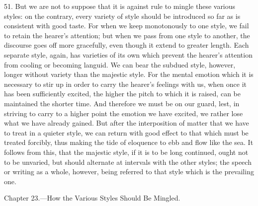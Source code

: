 51. But we are not to suppose that it is against rule to mingle these various styles: on the contrary, every variety of style should be introduced so far as is consistent with good taste. For when we keep monotonously to one style, we fail to retain the hearer’s attention; but when we pass from one style to another, the discourse goes off more gracefully, even though it extend to greater length. Each separate style, again, has varieties of its own which prevent the hearer’s attention from cooling or becoming languid. We can bear the subdued style, however, longer without variety than the majestic style. For the mental emotion which it is necessary to stir up in order to carry the hearer’s feelings with us, when once it has been sufficiently excited, the higher the pitch to which it is raised, can be maintained the shorter time. And therefore we must be on our guard, lest, in striving to carry to a higher point the emotion we have excited, we rather lose what we have already gained. But after the interposition of matter that we have to treat in a quieter style, we can return with good effect to that which must be treated forcibly, thus making the tide of eloquence to ebb and flow like the sea. It follows from this, that the majestic style, if it is to be long continued, ought not to be unvaried, but should alternate at intervals with the other styles; the speech or writing as a whole, however, being referred to that style which is the prevailing one.


Chapter 23.—How the Various Styles Should Be Mingled.

